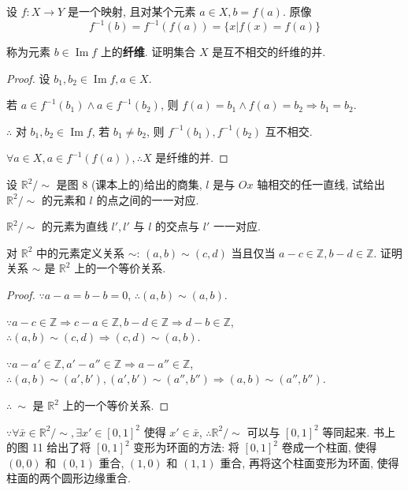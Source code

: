 \documentclass{ctexart}
\begin{document}
\begin{exercise}%
    设 $f:X\to Y$ 是一个映射, 且对某个元素 $a\in X,b=f(a)$. 原像
    \[f^{-1}(b)=f^{-1}(f(a))=\{x|f(x)=f(a)\}\]

    称为元素 $b\in\operatorname{Im}f$ 上的\textbf{纤维}. 证明集合 $X$ 是互不相交的纤维的并.
\end{exercise}
\begin{proof}
    设 $b_1,b_2\in\operatorname{Im}f,a\in X$.

    若 $a\in f^{-1}(b_1)\land a\in f^{-1}(b_2)$, 则 $f(a)=b_1\land f(a)=b_2\Rightarrow b_1=b_2$.

    $\therefore$ 对 $b_1,b_2\in\operatorname{Im}f$, 若 $b_1\neq b_2$, 则 $f^{-1}(b_1),f^{-1}(b_2)$ 互不相交.

    $\forall a\in X,a\in f^{-1}(f(a)),\therefore X$ 是纤维的并.
\end{proof}
\begin{exercise}%
    设 $\mathbb{R}^2/\sim$ 是图 8 (课本上的)给出的商集, $l$ 是与 $Ox$ 轴相交的任一直线, 试给出 $\mathbb{R}^2/\sim$ 的元素和 $l$ 的点之间的一一对应.
\end{exercise}
\begin{solution}
    $\mathbb{R}^2/\sim$ 的元素为直线 $l',l'$ 与 $l$ 的交点与 $l'$ 一一对应.
\end{solution}
\begin{exercise}%
    对 $\mathbb{R}^2$ 中的元素定义关系 $\sim$: $(a,b)\sim(c,d)$ 当且仅当 $a-c\in\mathbb{Z},b-d\in\mathbb{Z}$. 证明关系 $\sim$ 是 $\mathbb{R}^2$ 上的一个等价关系.
\end{exercise}
\begin{proof}
    $\because a-a=b-b=0$, $\therefore(a,b)\sim(a,b)$.

    $\because a-c\in\mathbb{Z}\Rightarrow c-a\in\mathbb{Z},b-d\in\mathbb{Z}\Rightarrow d-b\in\mathbb{Z}$, $\therefore(a,b)\sim(c,d)\Rightarrow(c,d)\sim(a,b)$.

    $\because a-a'\in\mathbb{Z},a'-a''\in\mathbb{Z}\Rightarrow a-a''\in\mathbb{Z}$, $\therefore(a,b)\sim(a',b'),(a',b')\sim(a'',b'')\Rightarrow(a,b)\sim(a'',b'')$.

    $\therefore\ \sim$ 是 $\mathbb{R}^2$ 上的一个等价关系.
\end{proof}
\begin{note}
    $\because\forall\bar{x}\in\mathbb{R}^2/\sim,\exists x'\in[0,1]^2$ 使得 $x'\in\bar{x}$, $\therefore\mathbb{R}^2/\sim$ 可以与 $[0,1]^2$ 等同起来. 书上的图 11 给出了将 $[0,1]^2$ 变形为环面的方法: 将 $[0,1]^2$ 卷成一个柱面, 使得 $(0,0)$ 和 $(0,1)$ 重合, $(1,0)$ 和 $(1,1)$ 重合, 再将这个柱面变形为环面, 使得柱面的两个圆形边缘重合.
\end{note}
\end{document}

